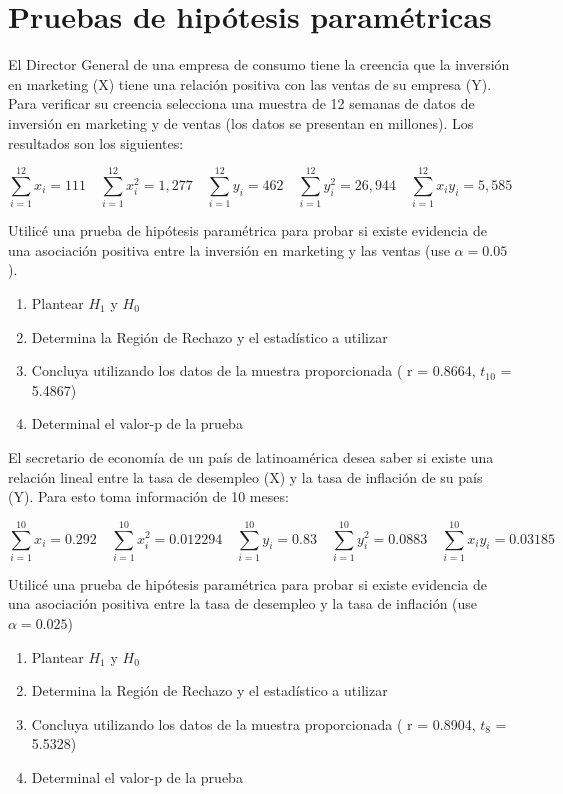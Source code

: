 \documentclass[addpoints]{exam}
\theoremstyle{mytheor}
\begin{document}
  \section*{Pruebas de hipótesis paramétricas}
  
  
  \begin{questions} 
  \question  El Director General de una empresa de consumo tiene la creencia que la inversión en marketing (X) tiene una relación positiva con las ventas de su empresa (Y). Para verificar su creencia selecciona una muestra de 12 semanas de datos de inversión en marketing y de ventas (los datos se presentan en millones). Los resultados son los siguientes:
  
  $$ \sum_{i=1}^{12} x_i = 111 \quad \sum_{i=1}^{12} x_i^2 = 1,277 \quad \sum_{i=1}^{12} y_i = 462 \quad \sum_{i=1}^{12} y_i^2 = 26,944 \quad \sum_{i=1}^{12} x_i y_i = 5,585 $$
  
Utilicé una prueba de hipótesis paramétrica para probar si existe evidencia de una asociación positiva entre la inversión en marketing y las ventas (use $\alpha = 0.05$).

\begin{enumerate}
  \item Plantear $H_1$ y $H_0$ 
  \item Determina la Región de Rechazo y el estadístico a utilizar
  \item Concluya utilizando los datos de la muestra proporcionada ( r = 0.8664, $t_{10}$ = 5.4867)
  \item Determinal el valor-p de la prueba 
\end{enumerate}

  \question El secretario de economía de un país de latinoamérica desea saber si existe una relación lineal entre la tasa de desempleo (X) y la tasa de inflación de su país (Y). Para esto toma información de 10 meses:
  
  $$ \sum_{i=1}^{10} x_i = 0.292 \quad \sum_{i=1}^{10} x_i^2 = 0.012294  \quad \sum_{i=1}^{10} y_i = 0.83 \quad \sum_{i=1}^{10} y_i^2 = 0.0883 \quad \sum_{i=1}^{10} x_i y_i = 0.03185 $$
  
  
Utilicé una prueba de hipótesis paramétrica para probar si existe evidencia de una asociación positiva entre la tasa de desempleo y la tasa de inflación (use $\alpha = 0.025$) 

  \begin{enumerate}
  \item Plantear $H_1$ y $H_0$ 
  \item Determina la Región de Rechazo y el estadístico a utilizar
  \item Concluya utilizando los datos de la muestra proporcionada ( r = 0.8904, $t_8$ = 5.5328)
  \item Determinal el valor-p de la prueba 
\end{enumerate}
  


  
 
  
  \end{questions}

  
\end{document}
